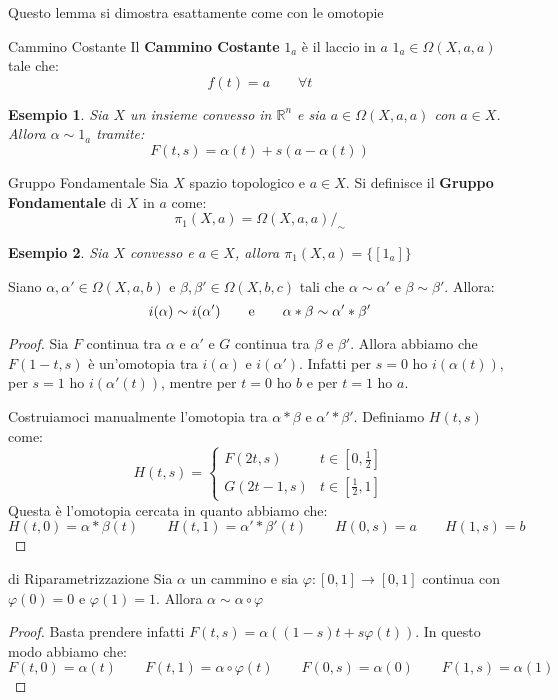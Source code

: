 \documentclass[11pt,a4paper,twoside]{article}
\newtheorem{es}{Esempio}
\theoremstyle{definition}
\begin{document}
Questo lemma si dimostra esattamente come con le omotopie

\begin{defn}{Cammino Costante}{}
	Il \textbf{Cammino Costante} $1_a$ è il laccio in $a$ $1_a \in \Omega(X, a, a)$ tale che:
	\[ f(t) = a\qquad \forall t \]
\end{defn}

\begin{es}
	Sia $X$ un insieme convesso in $\mathbb R^n$ e sia $a \in \Omega(X, a,a)$ con $a \in X$. Allora $\alpha \sim 1_a$ tramite:
	\[ F(t,s) = \alpha(t) + s(a-\alpha(t)) \]
\end{es}

\begin{defn}{Gruppo Fondamentale}{}
	Sia $X$ spazio topologico e $a \in X$. Si definisce il \textbf{Gruppo Fondamentale} di $X$ in $a$ come:
	\[ \pi_1(X, a) = \Omega(X, a, a)/_\sim \]
\end{defn}

\begin{es}
	Sia $X$ convesso e $a \in X$, allora $\pi_1(X, a) = \{[1_a]\}$
\end{es}

\begin{prop}{}{}
	Siano $\alpha, \alpha' \in \Omega(X, a, b)$ e $\beta, \beta' \in \Omega(X, b, c)$ tali che $\alpha \sim \alpha'$ e $\beta \sim \beta'$. Allora:
	\[ i(\alpha) \sim i(\alpha')\qquad \text e \qquad \alpha*\beta \sim \alpha'*\beta'\]
\end{prop}

\begin{proof}
	Sia $F$ continua tra $\alpha$ e $\alpha'$ e $G$ continua tra $\beta$ e $\beta'$. Allora abbiamo che $F(1-t,s)$ è un'omotopia tra $i(\alpha)$ e $i(\alpha')$. Infatti per $s = 0$ ho $i(\alpha(t))$, per $s = 1$ ho $i(\alpha'(t))$, mentre per $t = 0$ ho $b$ e per $t = 1$ ho $a$.

	Costruiamoci manualmente l'omotopia tra $\alpha *\beta$ e $\alpha'*\beta'$. Definiamo $H(t,s)$ come:
	\[ H(t,s) = \begin{cases}
		F(2t,s) & t \in [0,\frac 12]\\
		G(2t-1,s) & t \in [\frac 12,1]
	\end{cases}\]
	Questa è l'omotopia cercata in quanto abbiamo che:
	\[ H(t,0) = \alpha*\beta(t)\qquad H(t,1) = \alpha'*\beta'(t)\qquad H(0,s) = a\qquad H(1,s) = b \]
\end{proof}

\begin{lemma}{di Riparametrizzazione}{}\label{ripar}
	Sia $\alpha$ un cammino e sia $\varphi:[0,1] \to [0,1]$ continua con $\varphi(0) = 0$ e $\varphi(1) = 1$. Allora $\alpha \sim \alpha \circ \varphi$
\end{lemma}
\begin{proof}
	Basta prendere infatti $F(t,s) = \alpha((1-s)t + s\varphi(t))$. In questo modo abbiamo che:
	\[ F(t,0) = \alpha(t)\qquad F(t,1) = \alpha \circ \varphi(t)\qquad F(0,s) = \alpha(0)\qquad F(1,s) = \alpha(1) \]
\end{proof}
\end{document}
